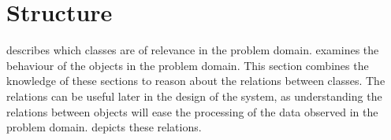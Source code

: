 \section{Structure}\label{sub:structure}

 describes which classes are of relevance in the problem domain.  examines the behaviour of the objects in the problem domain. This section combines the knowledge of these sections to reason about the relations between classes. The relations can be useful later in the design of the system, as understanding the relations between objects will ease the processing of the data observed in the problem domain.  depicts these relations.


